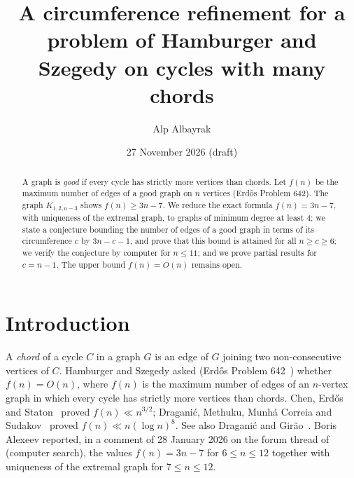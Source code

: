 \documentclass[11pt]{amsart}
\title{A circumference refinement for a problem of Hamburger and Szegedy on cycles with many chords}
\author{Alp Albayrak}
\date{27 November 2026 (draft)}
\theoremstyle{remark}
\begin{document}
\begin{abstract}
A graph is \emph{good} if every cycle has strictly more vertices than chords. Let $f(n)$ be the maximum number of edges of a good graph on $n$ vertices (Erd\H{o}s Problem 642). The graph $K_{1,2,n-3}$ shows $f(n)\ge 3n-7$. We reduce the exact formula $f(n)=3n-7$, with uniqueness of the extremal graph, to graphs of minimum degree at least $4$; we state a conjecture bounding the number of edges of a good graph in terms of its circumference $c$ by $3n-c-1$, and prove that this bound is attained for all $n\ge c\ge 6$; we verify the conjecture by computer for $n\le 11$; and we prove partial results for $c=n-1$. The upper bound $f(n)=O(n)$ remains open.
\end{abstract}

\maketitle

\section{Introduction}

A \emph{chord} of a cycle $C$ in a graph $G$ is an edge of $G$ joining two non-consecutive vertices of $C$. Hamburger and Szegedy asked (Erd\H{o}s Problem 642~\cite{EP642}) whether $f(n)=O(n)$, where $f(n)$ is the maximum number of edges of an $n$-vertex graph in which every cycle has strictly more vertices than chords. Chen, Erd\H{o}s and Staton~\cite{CES96} proved $f(n)\ll n^{3/2}$; Dragani\'c, Methuku, Munh\'a Correia and Sudakov~\cite{DMMS24} proved $f(n)\ll n(\log n)^8$. See also Dragani\'c and Gir\~ao~\cite{DG26}. Boris Alexeev reported, in a comment of 28 January 2026 on the forum thread of~\cite{EP642} (computer search), the values $f(n)=3n-7$ for $6\le n\le 12$ together with uniqueness of the extremal graph for $7\le n\le 12$.
\end{document}

